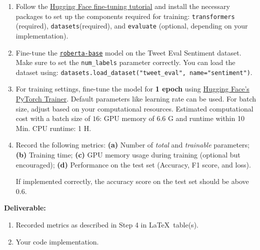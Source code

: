 \documentclass[11pt, oneside]{article}   	%
\begin{document}
\begin{enumerate}
    \item Follow the \href{https://huggingface.co/docs/transformers/training}{Hugging Face fine-tuning tutorial} and install the necessary packages to set up the components required for training: \texttt{transformers} (required), \texttt{datasets}(required), and \texttt{evaluate} (optional, depending on your implementation).
    \item Fine-tune the \texttt{\href{https://huggingface.co/roberta-base}{roberta-base}} model on the Tweet Eval Sentiment dataset. Make sure to set the \texttt{num\_labels} parameter correctly. You can load the dataset using: \texttt{datasets.load\_dataset("tweet\_eval", name="sentiment")}.
    \item For training settings, fine-tune the model for \textbf{1 epoch} using \href{https://huggingface.co/docs/transformers/training#trainer}{Hugging Face's PyTorch Trainer}. Default parameters like learning rate can be used. For batch size, adjust based on your computational resources. Estimated computational cost with a batch size of $16$: GPU memory of 6.6 G and runtime within 10 Min. CPU runtime: 1 H.
    
    \item \label{step4} Record the following metrics: \textbf{(a)} Number of \textit{total} and \textit{trainable} parameters;  \textbf{(b)} Training time; \textbf{(c)} GPU memory usage during training (optional but encouraged); \textbf{(d)} Performance on the test set (Accuracy, F1 score, and loss).

    If implemented correctly, the accuracy score on the test set should be above $0.6$.
\end{enumerate}
\textbf{Deliverable:}
\begin{enumerate}
    \item Recorded metrics as described in Step 4 in \LaTeX ~table(s).
    \item Your code implementation.
\end{enumerate}
\end{document}
